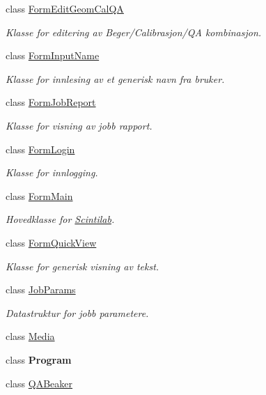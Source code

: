 \begin{DoxyCompactItemize}
class \hyperlink{class_scintilab_1_1_form_edit_geom_cal_q_a}{Form\+Edit\+Geom\+Cal\+Q\+A}
\begin{DoxyCompactList}\small\item\em Klasse for editering av Beger/\+Calibrasjon/\+Q\+A kombinasjon. \end{DoxyCompactList}\item 
class \hyperlink{class_scintilab_1_1_form_input_name}{Form\+Input\+Name}
\begin{DoxyCompactList}\small\item\em Klasse for innlesing av et generisk navn fra bruker. \end{DoxyCompactList}\item 
class \hyperlink{class_scintilab_1_1_form_job_report}{Form\+Job\+Report}
\begin{DoxyCompactList}\small\item\em Klasse for visning av jobb rapport. \end{DoxyCompactList}\item 
class \hyperlink{class_scintilab_1_1_form_login}{Form\+Login}
\begin{DoxyCompactList}\small\item\em Klasse for innlogging. \end{DoxyCompactList}\item 
class \hyperlink{class_scintilab_1_1_form_main}{Form\+Main}
\begin{DoxyCompactList}\small\item\em Hovedklasse for \hyperlink{namespace_scintilab}{Scintilab}. \end{DoxyCompactList}\item 
class \hyperlink{class_scintilab_1_1_form_quick_view}{Form\+Quick\+View}
\begin{DoxyCompactList}\small\item\em Klasse for generisk visning av tekst. \end{DoxyCompactList}\item 
class \hyperlink{class_scintilab_1_1_job_params}{Job\+Params}
\begin{DoxyCompactList}\small\item\em Datastruktur for jobb parametere. \end{DoxyCompactList}\item 
class \hyperlink{class_scintilab_1_1_media}{Media}
\item 
class {\bfseries Program}
\item 
class \hyperlink{class_scintilab_1_1_q_a_beaker}{Q\+A\+Beaker}

\end{DoxyCompactItemize}
